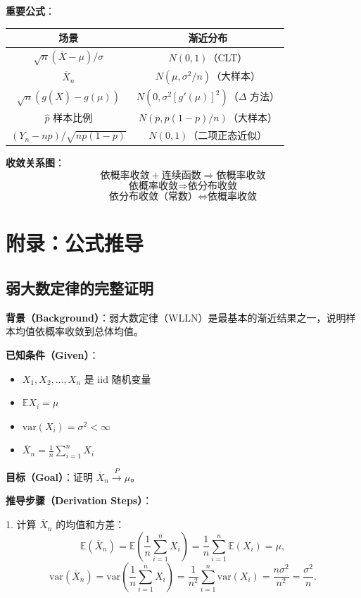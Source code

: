 \textbf{重要公式}：
\begin{center}
\begin{tabular}{|c|c|}
\hline
\textbf{场景} & \textbf{渐近分布} \\ \hline
$\sqrt{n}(\overline{X} - \mu)/\sigma$ & $N(0,1)$（CLT）\\ \hline
$\overline{X}_n$ & $N(\mu, \sigma^2/n)$（大样本）\\ \hline
$\sqrt{n}(g(\overline{X}) - g(\mu))$ & $N(0, \sigma^2[g'(\mu)]^2)$（$\Delta$ 方法）\\ \hline
$\widehat{p}$ 样本比例 & $N(p, p(1-p)/n)$（大样本）\\ \hline
$(Y_n - np)/\sqrt{np(1-p)}$ & $N(0,1)$（二项正态近似）\\ \hline
\end{tabular}
\end{center}

\textbf{收敛关系图}：
\[
\text{依概率收敛} + \text{连续函数} \Rightarrow \text{依概率收敛}
\]
\[
\text{依概率收敛} \Rightarrow \text{依分布收敛}
\]
\[
\text{依分布收敛（常数）} \Leftrightarrow \text{依概率收敛}
\]

\section{附录：公式推导}\label{sec:appendix-ch5}

\subsection{弱大数定律的完整证明}\label{sec:wlln-proof}

\textbf{背景（Background）}：弱大数定律（WLLN）是最基本的渐近结果之一，说明样本均值依概率收敛到总体均值。

\textbf{已知条件（Given）}：
\begin{itemize}
\item $X_1, X_2, \ldots, X_n$ 是 iid 随机变量
\item $\mathbb{E}X_i = \mu$
\item $\text{var}(X_i) = \sigma^2 < \infty$
\item $\overline{X}_n = \frac{1}{n}\sum_{i=1}^n X_i$
\end{itemize}

\textbf{目标（Goal）}：证明 $\overline{X}_n \xrightarrow{P} \mu$。

\textbf{推导步骤（Derivation Steps）}：

1. 计算 $\overline{X}_n$ 的均值和方差：
\[
\mathbb{E}(\overline{X}_n) = \mathbb{E}\left(\frac{1}{n}\sum_{i=1}^n X_i\right) = \frac{1}{n}\sum_{i=1}^n \mathbb{E}(X_i) = \mu,
\]
\[
\text{var}(\overline{X}_n) = \text{var}\left(\frac{1}{n}\sum_{i=1}^n X_i\right) = \frac{1}{n^2}\sum_{i=1}^n \text{var}(X_i) = \frac{n\sigma^2}{n^2} = \frac{\sigma^2}{n}.
\]

